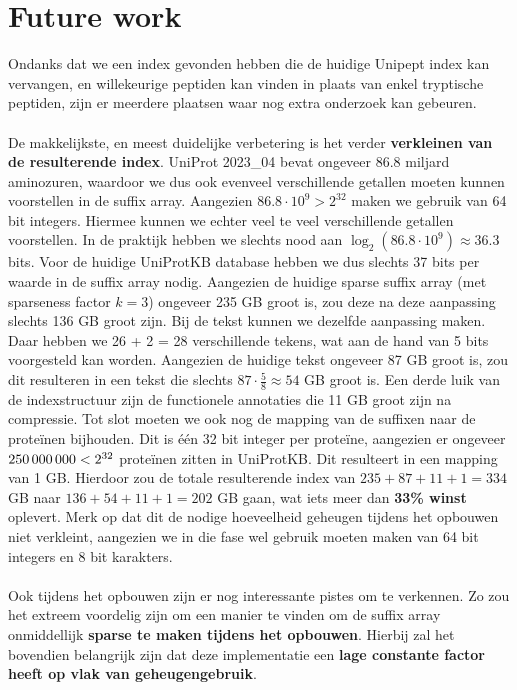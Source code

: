\section{Future work}
Ondanks dat we een index gevonden hebben die de huidige Unipept index kan vervangen, en willekeurige peptiden kan vinden in plaats van enkel tryptische peptiden, zijn er meerdere plaatsen waar nog extra onderzoek kan gebeuren.
\\ \\
De makkelijkste, en meest duidelijke verbetering is het verder \textbf{verkleinen van de resulterende index}.
UniProt 2023\_04 bevat ongeveer 86.8 miljard aminozuren, waardoor we dus ook evenveel verschillende getallen moeten kunnen voorstellen in de suffix array.
Aangezien $86.8 \cdot 10^9 > 2^{32}$ maken we gebruik van 64 bit integers.
Hiermee kunnen we echter veel te veel verschillende getallen voorstellen.
In de praktijk hebben we slechts nood aan $\log_2(86.8 \cdot 10^9) \approx 36.3$ bits.
Voor de huidige UniProtKB database hebben we dus slechts 37 bits per waarde in de suffix array nodig.
Aangezien de huidige sparse suffix array (met sparseness factor $k = 3$) ongeveer 235 GB groot is, zou deze na deze aanpassing slechts 136 GB groot zijn.
Bij de tekst kunnen we dezelfde aanpassing maken.
Daar hebben we 26 + 2 = 28 verschillende tekens, wat aan de hand van 5 bits voorgesteld kan worden.
Aangezien de huidige tekst ongeveer 87 GB groot is, zou dit resulteren in een tekst die slechts $87 \cdot \frac{5}{8} \approx 54$ GB groot is.
Een derde luik van de indexstructuur zijn de functionele annotaties die 11 GB groot zijn na compressie.
Tot slot moeten we ook nog de mapping van de suffixen naar de proteïnen bijhouden.
Dit is één 32 bit integer per proteïne, aangezien er ongeveer $250\thinspace000\thinspace000 < 2^{32}$ proteïnen zitten in UniProtKB\@.
Dit resulteert in een mapping van 1 GB\@.
Hierdoor zou de totale resulterende index van $235 + 87 + 11 + 1 = 334$ GB naar $136 + 54 + 11 + 1 = 202$ GB gaan, wat iets meer dan \textbf{33\% winst} oplevert.
Merk op dat dit de nodige hoeveelheid geheugen tijdens het opbouwen niet verkleint, aangezien we in die fase wel gebruik moeten maken van 64 bit integers en 8 bit karakters.
\\ \\
Ook tijdens het opbouwen zijn er nog interessante pistes om te verkennen.
Zo zou het extreem voordelig zijn om een manier te vinden om de suffix array onmiddellijk \textbf{sparse te maken tijdens het opbouwen}.
Hierbij zal het bovendien belangrijk zijn dat deze implementatie een \textbf{lage constante factor heeft op vlak van geheugengebruik}.
